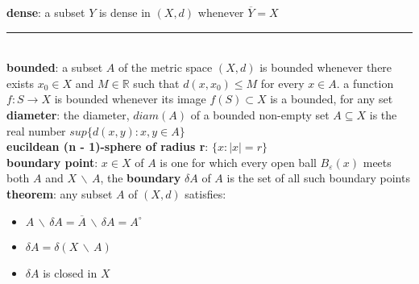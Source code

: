 \documentclass[a4paper]{article}
\newcommand*\closure[1]{\overline{#1}}
\newcommand*\interior[1]{{#1}^\circ}
\newcommand*\abs[1]{\vert #1 \vert}
\newcommand*\setremove[2]{#1 \, \backslash \, #2}
\newcommand*\linesep[0]{\noindent\rule{\textwidth}{0.5pt}\\}
\begin{document}
\begin{framed}
	\noindent
	\textbf{dense}: a subset $Y$ is dense in $(X, d)$ whenever $\closure{Y} = X$
	
	\linesep
	\textbf{bounded}: a subset $A$ of the metric space $(X,d)$ is bounded whenever there exists $x_0 \in X$ and $M \in \mathbb{R}$ such that $d(x, x_0) \leq M$ for every $x \in A$. a function $f: S \rightarrow X$ is bounded whenever its image $f(S) \subset X$ is a bounded, for any set\\
	
	\noindent
	\textbf{diameter}: the diameter, $diam(A)$ of a bounded non-empty set $A \subseteq X$ is the real number $sup\{d(x, y) : x, y \in A\}$\\
	
	\noindent
	\textbf{eucildean (n - 1)-sphere of radius r}: $\{x : \abs{x} = r\}$\\
	
	\noindent
	\textbf{boundary point}: $x \in X$ of $A$ is one for which every open ball $B_\varepsilon(x)$ meets both $A$ and $\setremove{X}{A}$, the \textbf{boundary} $\delta A$ of $A$ is the set of all such boundary points\\
	
	\noindent
	\textbf{theorem}: any subset $A$ of $(X, d)$ satisfies:
		\begin{multicols}{3}
		\begin{itemize}
			\item $\setremove{A}{\delta A} = \setremove{\closure{A}}{\delta A} = \interior{A}$
			\item $\delta A = \delta(\setremove{X}{A})$
			\item $\delta A$ is closed in $X$
		\end{itemize}	
	\end{multicols}
\end{framed}
\end{document}
